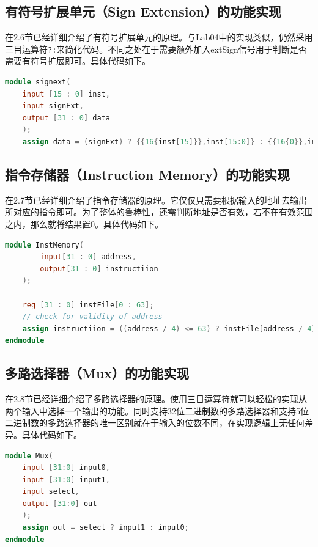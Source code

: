\subsection{有符号扩展单元（Sign Extension）的功能实现}
在2.6节已经详细介绍了有符号扩展单元的原理。与Lab04中的实现类似，仍然采用三目运算符\texttt{?:}来简化代码。不同之处在于需要额外加入extSign信号用于判断是否需要有符号扩展即可。具体代码如下。

\begin{lstlisting}[language=Verilog]
    module signext(
    input [15 : 0] inst,
    input signExt,
    output [31 : 0] data
    );
    assign data = (signExt) ? {{16{inst[15]}},inst[15:0]} : {{16{0}},inst[15:0]};
\end{lstlisting}

\subsection{指令存储器（Instruction Memory）的功能实现}
在2.7节已经详细介绍了指令存储器的原理。它仅仅只需要根据输入的地址去输出所对应的指令即可。为了整体的鲁棒性，还需判断地址是否有效，若不在有效范围之内，那么就将结果置0。具体代码如下。
\begin{lstlisting}[language=Verilog]
module InstMemory(
        input[31 : 0] address,
        output[31 : 0] instructiion
    );

    reg [31 : 0] instFile[0 : 63];
    // check for validity of address
    assign instructiion = ((address / 4) <= 63) ? instFile[address / 4] : 0;
endmodule
\end{lstlisting}

\subsection{多路选择器（Mux）的功能实现}
在2.8节已经详细介绍了多路选择器的原理。使用三目运算符就可以轻松的实现从两个输入中选择一个输出的功能。同时支持32位二进制数的多路选择器和支持5位二进制数的多路选择器的唯一区别就在于输入的位数不同，在实现逻辑上无任何差异。具体代码如下。
\begin{lstlisting}[language=Verilog]
module Mux(
    input [31:0] input0,
    input [31:0] input1,
    input select,
    output [31:0] out
    );
    assign out = select ? input1 : input0;
endmodule
\end{lstlisting}

